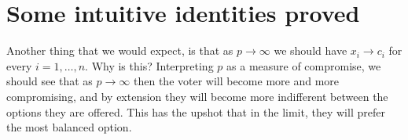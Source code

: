 \documentclass[
10pt, %
a4paper, %
oneside, %
headinclude,footinclude, %
BCOR5mm, %
]{scrartcl}
\begin{document}
\section{Some intuitive identities proved}

Another thing that we would expect, is that as $p \rightarrow \infty$ we should have $x_i \rightarrow c_i$ for every $i = 1,\ldots,n$. Why is this? Interpreting $p$ as a measure of compromise, we should see that as $p \rightarrow \infty$ then the voter will become more and more compromising, and by extension they will become more indifferent between the options they are offered. This has the upshot that in the limit, they will prefer the most balanced option.


\renewcommand{\refname}{\spacedlowsmallcaps{References}} %




\end{document}
